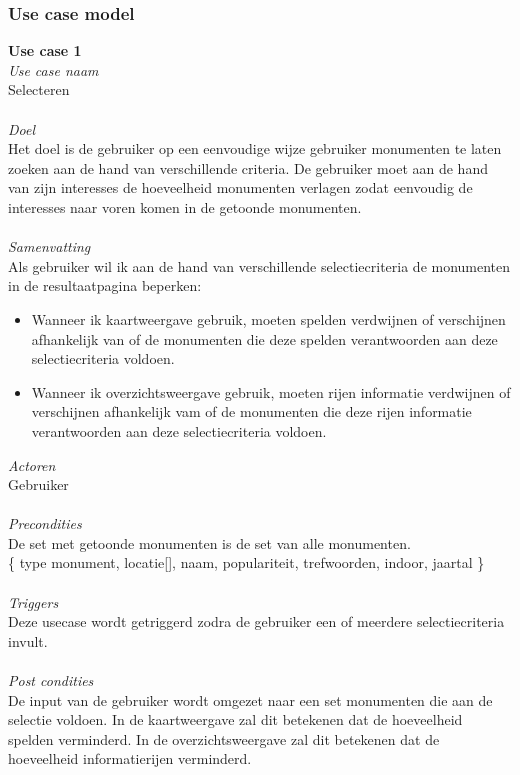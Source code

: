\documentclass[a4paper,10pt]{article}
\begin{document}
		\subsubsection{Use case model}
			\textbf{Use case 1}\\
			\textit{Use case naam}\\
			Selecteren\\ \\
			\textit{Doel}\\
			Het doel is de gebruiker op een eenvoudige wijze gebruiker monumenten te laten zoeken aan de hand van verschillende criteria. De gebruiker moet aan de hand van zijn interesses de hoeveelheid monumenten verlagen zodat eenvoudig de interesses naar voren komen in de getoonde monumenten.\\ \\
			\textit{Samenvatting}\\
			Als gebruiker wil ik aan de hand van verschillende selectiecriteria de monumenten in de resultaatpagina beperken:
			\begin{itemize}
				\item Wanneer ik kaartweergave gebruik, moeten spelden verdwijnen of verschijnen afhankelijk van of de monumenten die deze spelden verantwoorden aan deze selectiecriteria voldoen.
				\item Wanneer ik overzichtsweergave gebruik, moeten rijen informatie verdwijnen of verschijnen afhankelijk vam of de monumenten die deze rijen informatie verantwoorden aan deze selectiecriteria voldoen.
			\end{itemize}
			\textit{Actoren}\\
			Gebruiker\\ \\
			\textit{Precondities}\\
			De set met getoonde monumenten is de set van alle monumenten.\\
			\{ type monument, locatie[], naam, populariteit, trefwoorden, indoor, jaartal \} \\ \\
			\textit{Triggers}\\
			Deze usecase wordt getriggerd zodra de gebruiker een of meerdere selectiecriteria invult.\\ \\
			\textit{Post condities}\\			
			De input van de gebruiker wordt omgezet naar een set monumenten die aan de selectie voldoen. In de kaartweergave zal dit betekenen dat de hoeveelheid spelden verminderd. In de overzichtsweergave zal dit betekenen dat de hoeveelheid informatierijen verminderd.\\ \\			
\end{document}
